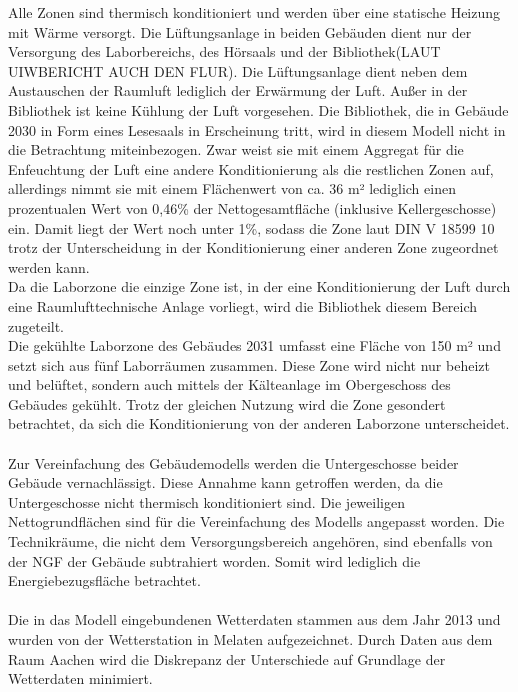 Alle Zonen sind thermisch konditioniert und werden über eine statische Heizung mit Wärme versorgt. Die Lüftungsanlage in beiden Gebäuden dient nur der Versorgung des Laborbereichs, des Hörsaals und der Bibliothek(LAUT UIWBERICHT AUCH DEN FLUR). Die Lüftungsanlage dient neben dem Austauschen der Raumluft lediglich der Erwärmung der Luft. Außer in der Bibliothek ist keine Kühlung der Luft vorgesehen. Die Bibliothek, die in Gebäude 2030 in Form eines Lesesaals in Erscheinung tritt, wird in diesem Modell nicht in die Betrachtung miteinbezogen. Zwar weist sie mit einem Aggregat für die Enfeuchtung der Luft eine andere Konditionierung als die restlichen Zonen auf, allerdings nimmt sie mit einem Flächenwert von ca. 36 m² lediglich einen prozentualen Wert von 0,46\% der Nettogesamtfläche (inklusive Kellergeschosse) ein. Damit liegt der Wert noch unter 1\%, sodass die Zone laut DIN V 18599 10 trotz der Unterscheidung in der Konditionierung einer anderen Zone zugeordnet werden kann.\\
Da die Laborzone die einzige Zone ist, in der eine Konditionierung der Luft durch eine Raumlufttechnische Anlage vorliegt, wird die Bibliothek diesem Bereich zugeteilt. \\
Die gekühlte Laborzone des Gebäudes 2031 umfasst eine Fläche von 150 m² und setzt sich aus fünf Laborräumen zusammen. Diese Zone wird nicht nur beheizt und belüftet, sondern auch mittels der Kälteanlage im Obergeschoss des Gebäudes gekühlt. Trotz der gleichen Nutzung wird die Zone gesondert betrachtet, da sich die Konditionierung von der anderen Laborzone unterscheidet.\\
\\
Zur Vereinfachung des Gebäudemodells werden die Untergeschosse beider Gebäude vernachlässigt. Diese Annahme kann getroffen werden, da die Untergeschosse nicht thermisch konditioniert sind. Die jeweiligen Nettogrundflächen sind für die Vereinfachung des Modells angepasst worden. Die Technikräume, die nicht dem Versorgungsbereich angehören, sind ebenfalls von der NGF der Gebäude subtrahiert worden. Somit wird lediglich die Energiebezugsfläche betrachtet. \\
\\
Die in das Modell eingebundenen Wetterdaten stammen aus dem Jahr 2013 und wurden von der Wetterstation in Melaten aufgezeichnet. Durch Daten aus dem Raum Aachen wird die Diskrepanz der Unterschiede auf Grundlage der Wetterdaten minimiert.\\
\\
